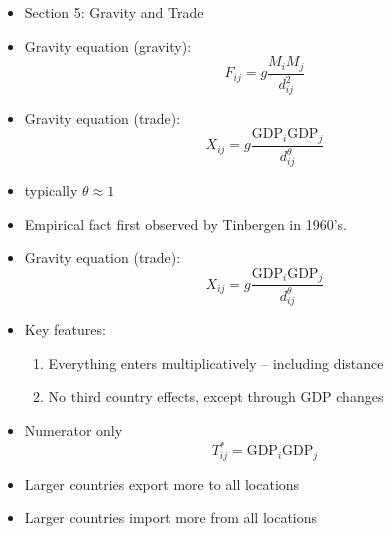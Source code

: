 \documentclass[ignorenonframetext,]{beamer}
\begin{document}
\begin{frame}

    \begin{itemize}
        \item Section 5: Gravity and Trade
    \end{itemize}

\end{frame}

\begin{frame}
    
    \begin{itemize}
        \item Gravity equation (gravity):
        \begin{equation*}
            F_{ij} = g \frac{M_i M_j}{d_{ij}^2}
        \end{equation*}
        \item Gravity equation (trade):
        \begin{equation*}
            X_{ij} = g \frac{\mbox{GDP}_i \mbox{GDP}_j}{d_{ij}^\theta}
        \end{equation*}
        \item typically $\theta \approx 1$
        \item Empirical fact first observed by Tinbergen in 1960's.
    \end{itemize}

\end{frame}

\begin{frame}
    
    \begin{itemize}
        \item Gravity equation (trade):
        \begin{equation*}
            X_{ij} = g \frac{\mbox{GDP}_i \mbox{GDP}_j}{d_{ij}^\theta}
        \end{equation*}
        \item Key features:    
        \begin{enumerate}
            \item Everything enters multiplicatively -- including distance
            \item No third country effects, except through GDP changes
        \end{enumerate}
    \end{itemize}

\end{frame}

\begin{frame}
   
    \begin{itemize}
        \item Numerator only
        \begin{equation*}
            T^*_{ij} = \mbox{GDP}_i \mbox{GDP}_j
        \end{equation*}
        \item Larger countries export more to all locations
        \item Larger countries import more from all locations
    \end{itemize}

\end{frame}
\end{document}
